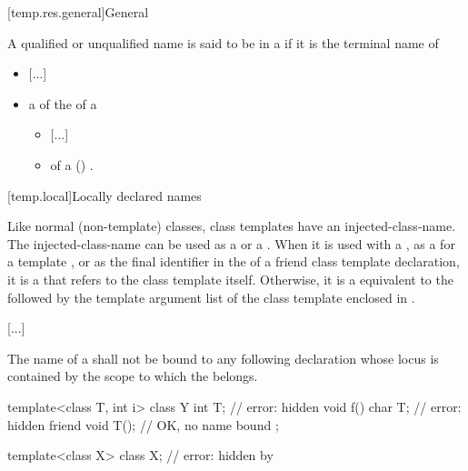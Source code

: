 \documentclass{wg21}
\begin{document}
[temp.res.general]{General}


%
A qualified or unqualified name is said to be in
a 
if it is the terminal name of
\begin{itemize}
\item \textcolor{noteclr}{[...]}
\item a  of the  of a
\begin{itemize}
    \item \textcolor{noteclr}{[...]}
    \item {} of a () .
\end{itemize}
\end{itemize}

[temp.local]{Locally declared names}

\pnum
Like normal (non-template) classes, class templates have an
injected-class-name.
The
injected-class-name can be used
as a  or a .
When it is used with a
,
as a  for a  template ,
or as the final identifier in the  of
a friend class template declaration,
it is a  that refers to the
class template itself.
Otherwise, it is a 
equivalent to the 
followed by
the template argument list
of the class template
enclosed in \tcode{<>}.

\textcolor{noteclr}{[...]}

\pnum
The name of a 
shall not be bound to any following declaration
whose locus is contained by the scope
to which the  belongs.
\begin{example}
\begin{codeblock}
template<class T, int i> class Y {
  int T;                                // error:  hidden
  void f() {
    char T;                             // error:  hidden
  }
  friend void T();                      // OK, no name bound
};

template<class X> class X;              // error: hidden by 
\end{codeblock}
\end{example}
\end{document}
